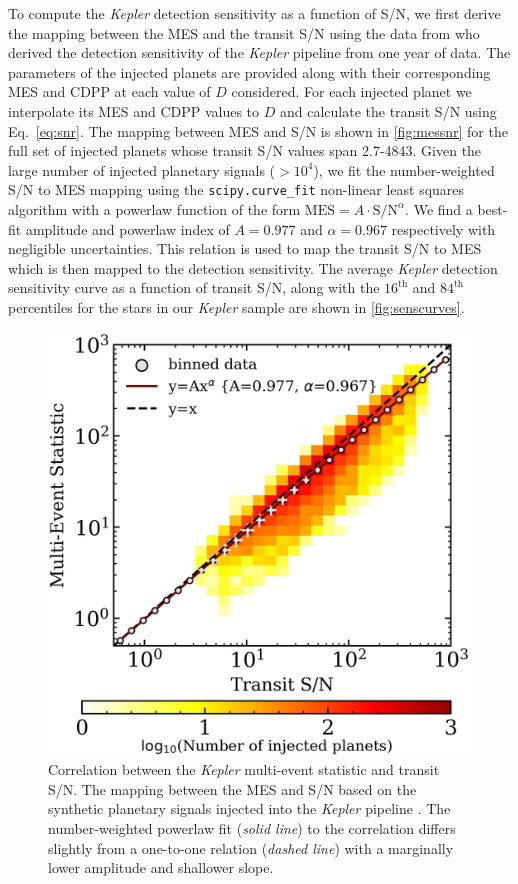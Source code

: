 \documentclass[twocolumn]{emulateapj}
\newcommand{\kepler}[1]{\emph{Kepler}#1}
\begin{document}
To compute the \kepler{} detection sensitivity as a function of S/N, we first
derive the mapping between the MES and the transit S/N using the data from \cite{christiansen15} who
derived the detection sensitivity of the \kepler{} pipeline from one year of data. 
The parameters of the injected planets are provided along with their corresponding MES and CDPP at each value of
$D$ considered. For each injected planet we interpolate its MES and CDPP values to $D$ and calculate
the transit S/N using Eq.~\ref{eq:snr}. The mapping between MES and S/N is shown in \autoref{fig:messnr}
for the full set of injected planets whose transit S/N values span 2.7-4843. Given the large number of injected planetary
signals ($>10^4$), we fit the number-weighted S/N to MES mapping using the \texttt{scipy.curve\_fit} non-linear least
squares algorithm with a powerlaw function of the form $\text{MES} = A\cdot \text{S/N}^{\alpha}$. We find a best-fit
amplitude and powerlaw index of $A=0.977$ and $\alpha=0.967$ respectively with negligible uncertainties.
This relation is used to map the transit S/N to MES
which is then mapped to the detection sensitivity. The average \kepler{} detection sensitivity curve as a function of
transit S/N, along with the $16^{\text{th}}$ and $84^{\text{th}}$ percentiles for the stars in our \kepler{} sample
are shown in \autoref{fig:senscurves}.


\begin{figure}
  \centering
  \includegraphics[width=0.98\hsize]{figures/MES_SNR.png}
  \caption{Correlation between the \kepler{} multi-event statistic and transit S/N. The mapping between the MES and
    S/N based on the synthetic planetary signals injected into the \kepler{} pipeline \citep{christiansen15}.
    The number-weighted powerlaw fit (\emph{solid line}) to the correlation differs slightly from a one-to-one relation
    (\emph{dashed line}) with a marginally lower amplitude and shallower slope.}  
  \label{fig:messnr}
\end{figure}
\end{document}
